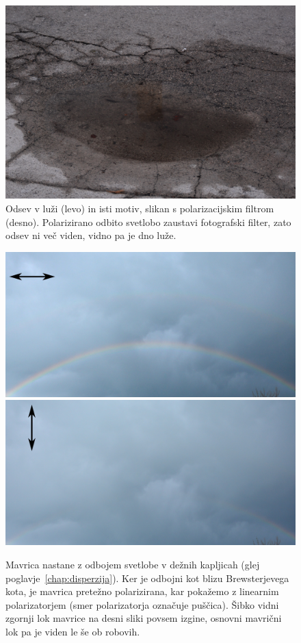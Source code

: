 \begin{remark}
\begin{figure}[!h]
\includegraphics[width=7truecm]{slike/04_photos_grad2.jpg}
\caption{Odsev v luži (levo) in isti motiv, slikan s polarizacijskim filtrom (desno). 
Polarizirano odbito svetlobo zaustavi fotografski filter, zato odsev ni več viden,
vidno pa je dno luže.}
\label{fig:04_odsevgrad}
\end{figure}
\begin{figure}[!h]
\centering
\includegraphics[width=7truecm]{slike/04_PolMavrica_a.jpg}\hfill
\includegraphics[width=7truecm]{slike/04_PolMavrica_b.jpg}
\caption{Mavrica nastane z odbojem svetlobe v dežnih kapljicah (glej poglavje~\ref{chap:disperzija}).
Ker je odbojni kot blizu Brewsterjevega kota, je mavrica pretežno polarizirana, kar pokažemo z linearnim 
polarizatorjem (smer polarizatorja označuje puščica). Šibko vidni zgornji lok mavrice na desni sliki povsem 
izgine, osnovni mavrični lok pa je viden le še ob robovih.}
\label{fig:04_MavricaFoto}
\end{figure}
\end{remark}

